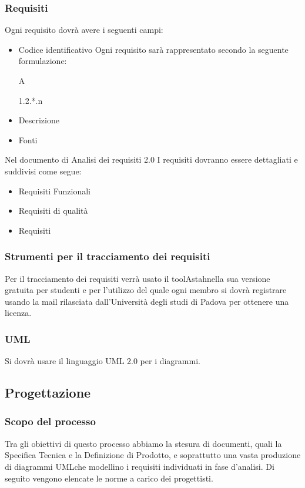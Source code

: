\documentclass[a4paper,11pt]{article}
\begin{document}
			\subsubsection{Requisiti}
			Ogni requisito dovrà avere i seguenti campi:
			\begin{itemize}
			\item Codice identificativo
			Ogni requisito sarà rappresentato secondo la seguente formulazione:
					\begin{center}
					\begin{Large} A\end{Large}  \begin{normalsize}1.2.*.n	\end{normalsize}					
					\end{center}
			\item Descrizione
			\item Fonti
			\end{itemize}
			Nel documento di Analisi dei requisiti 2.0
			I requisiti dovranno essere dettagliati  e suddivisi come segue:
			\begin{itemize}
			\item Requisiti Funzionali
			\item Requisiti di qualità
			\item Requisiti 
			\end{itemize}

	
			\subsubsection{Strumenti per il tracciamento dei requisiti}
			Per il tracciamento dei requisiti verrà usato il tool\addglos Astah\addglos nella sua versione gratuita per studenti e per l'utilizzo del quale ogni membro si dovrà registrare usando la mail rilasciata dall'Università degli studi di Padova per ottenere una licenza.  
			\subsubsection{UML}
			Si dovrà usare il linguaggio UML 2.0 per i diagrammi.
		\subsection{Progettazione}
			\subsubsection{Scopo del processo}
			Tra gli obiettivi di questo processo abbiamo la stesura di documenti, quali la Specifica Tecnica e la Definizione di Prodotto, e soprattutto una vasta produzione di diagrammi UML\addglos che modellino i requisiti individuati in fase d'analisi. Di seguito vengono elencate le norme a carico dei progettisti.
\end{document}
